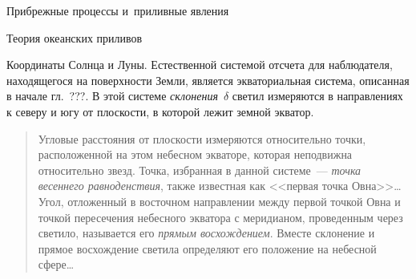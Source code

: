 \begin{chapter}{Прибрежные процессы и~приливные явления}
\begin{section}{Теория океанских приливов}
\begin{paragraph}{Координаты Солнца и Луны.}
Естественной системой отсчета для наблюдателя, находящегося на поверхности
Земли, является экваториальная система, описанная в начале гл.~???.
В этой системе \emph{склонения}~$\delta$ 
светил измеряются в направлениях к северу и югу от плоскости,
в которой лежит земной экватор.
%
\begin{quotation}
Угловые расстояния от плоскости измеряются относительно точки, расположенной 
на этом небесном экваторе, которая неподвижна относительно
звезд. Точка, избранная в данной системе~--- 
\emph{точка весеннего равноденствия}, также известная как
<<первая точка Овна>>\dots{} Угол, отложенный в восточном направлении 
между первой точкой Овна и точкой пересечения небесного экватора
с меридианом, проведенным через светило, называется его
\textit{прямым восхождением}. Вместе склонение и прямое восхождение светила
определяют его положение на небесной сфере\dots{}
%


\end{quotation}
\end{paragraph}
\end{section}
\end{chapter}
